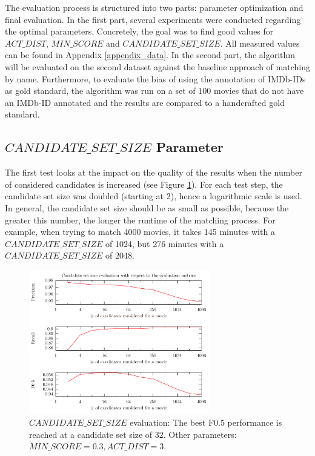 The evaluation process is structured into two parts: parameter optimization and final evaluation.
In the first part, several experiments were conducted regarding the optimal parameters.
Concretely, the goal was to find good values for $ACT\_DIST$, $MIN\_SCORE$ and $CANDIDATE\_SET\_SIZE$.
All measured values can be found in Appendix \ref{appendix_data}.
In the second part, the algorithm will be evaluated on the second dataset against the baseline approach of matching by name.
Furthermore, to evaluate the bias of using the annotation of IMDb-IDs as gold standard, the algorithm was run on a set of 100 movies that do not have an IMDb-ID annotated and the results are compared to a handcrafted gold standard.

\subsection{$CANDIDATE\_SET\_SIZE$ Parameter}
The first test looks at the impact on the quality of the results when the number of considered candidates is increased (see Figure \ref{fig_candidate_set_size}).
For each test step, the candidate set size was doubled (starting at 2), hence a logarithmic scale is used.
In general, the candidate set size should be as small as possible, because the greater this number, the longer the runtime of the matching process.
For example, when trying to match 4000 movies, it takes 145 minutes with a $CANDIDATE\_SET\_SIZE$ of 1024, but 276 minutes with a $CANDIDATE\_SET\_SIZE$ of 2048.

\begin{figure}[h!]
  \begin{center}
  \includegraphics[width=0.7\textwidth]{images/candidateSetSize.pdf}
  \end{center}
  \caption{$CANDIDATE\_SET\_SIZE$ evaluation: The best F0.5 performance is reached at a candidate set size of 32. Other parameters: $MIN\_SCORE = 0.3, ACT\_DIST = 3$.}
  \label{fig_candidate_set_size}
\end{figure}

